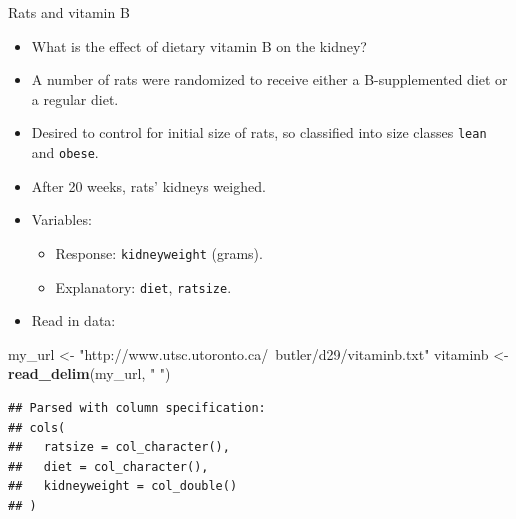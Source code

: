 \documentclass[
  ignorenonframetext,
]{beamer}
\newenvironment{Shaded}{\begin{snugshade}}{\end{snugshade}}
\newcommand{\KeywordTok}[1]{\textcolor[rgb]{0.13,0.29,0.53}{\textbf{#1}}}
\newcommand{\NormalTok}[1]{#1}
\newcommand{\StringTok}[1]{\textcolor[rgb]{0.31,0.60,0.02}{#1}}
\begin{document}
\begin{frame}[fragile]{Rats and vitamin B}
\protect\hypertarget{rats-and-vitamin-b}{}

\begin{itemize}
\item
  What is the effect of dietary vitamin B on the kidney?
\item
  A number of rats were randomized to receive either a B-supplemented
  diet or a regular diet.
\item
  Desired to control for initial size of rats, so classified into size
  classes \texttt{lean} and \texttt{obese}.
\item
  After 20 weeks, rats' kidneys weighed.
\item
  Variables:

  \begin{itemize}
  \item
    Response: \texttt{kidneyweight} (grams).
  \item
    Explanatory: \texttt{diet}, \texttt{ratsize}.
  \end{itemize}
\item
  Read in data:
\end{itemize}

\small

\begin{Shaded}
\begin{Highlighting}[]
\NormalTok{my_url <-}\StringTok{ "http://www.utsc.utoronto.ca/~butler/d29/vitaminb.txt"}
\NormalTok{vitaminb <-}\StringTok{ }\KeywordTok{read_delim}\NormalTok{(my_url, }\StringTok{" "}\NormalTok{)}
\end{Highlighting}
\end{Shaded}

\begin{verbatim}
## Parsed with column specification:
## cols(
##   ratsize = col_character(),
##   diet = col_character(),
##   kidneyweight = col_double()
## )
\end{verbatim}

\normalsize

\end{frame}
\end{document}

